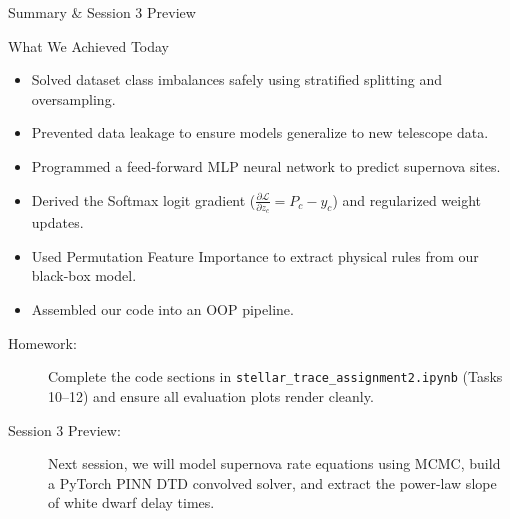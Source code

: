 \documentclass[9pt]{beamer}
\begin{document}
\begin{frame}{Summary \& Session 3 Preview}
  \begin{block}{What We Achieved Today}
    \begin{itemize}
      \item Solved dataset class imbalances safely using stratified splitting and oversampling.
      \item Prevented data leakage to ensure models generalize to new telescope data.
      \item Programmed a feed-forward MLP neural network to predict supernova sites.
      \item Derived the Softmax logit gradient ($\frac{\partial \mathcal{L}}{\partial z_c} = P_c - y_c$) and regularized weight updates.
      \item Used Permutation Feature Importance to extract physical rules from our black-box model.
      \item Assembled our code into an OOP pipeline.
    \end{itemize}
  \end{block}
  \begin{description}
    \item[Homework:] Complete the code sections in \texttt{stellar\_trace\_assignment2.ipynb} (Tasks 10--12) and ensure all evaluation plots render cleanly.
    \item[Session 3 Preview:] Next session, we will model supernova rate equations using MCMC, build a PyTorch PINN DTD convolved solver, and extract the power-law slope of white dwarf delay times.
  \end{description}
\end{frame}
\end{document}
